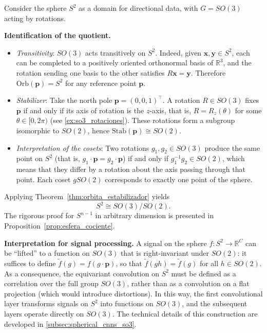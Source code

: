 \begin{example}\label{ex:aplicacion_teorema_gdl}
Consider the sphere $S^2$ as a domain for directional data, with $G = SO(3)$ acting by rotations.

\textbf{Identification of the quotient.}
\begin{itemize}
    \item \emph{Transitivity}: $SO(3)$ acts transitively on $S^2$. Indeed, given $\mathbf{x}, \mathbf{y} \in S^2$, each can be completed to a positively oriented orthonormal basis of $\mathbb{R}^3$, and the rotation sending one basis to the other satisfies $R\mathbf{x} = \mathbf{y}$. Therefore $\mathrm{Orb}(\mathbf{p}) = S^2$ for any reference point $\mathbf{p}$.

    \item \emph{Stabilizer}: Take the north pole $\mathbf{p} = (0,0,1)^{\!\top}$. A rotation $R \in SO(3)$ fixes $\mathbf{p}$ if and only if its axis of rotation is the $z$-axis, that is, $R = R_z(\theta)$ for some $\theta \in [0, 2\pi)$ (see \autoref{ex:so3_rotaciones}). These rotations form a subgroup isomorphic to $SO(2)$, hence $\mathrm{Stab}(\mathbf{p}) \cong SO(2)$.

    \item \emph{Interpretation of the cosets}: Two rotations $g_1, g_2 \in SO(3)$ produce the same point on $S^2$ (that is, $g_1 \cdot \mathbf{p} = g_2 \cdot \mathbf{p}$) if and only if $g_1^{-1}g_2 \in SO(2)$, which means that they differ by a rotation about the axis passing through that point. Each coset $gSO(2)$ corresponds to exactly one point of the sphere.
\end{itemize}
Applying Theorem~\ref{thm:orbita_estabilizador} yields
\begin{equation}\label{eq:esfera_cociente_ejemplo}
    S^2 \cong SO(3)/SO(2).
\end{equation}
The rigorous proof for $S^{n-1}$ in arbitrary dimension is presented in Proposition~\ref{prop:esfera_cociente}.

\textbf{Interpretation for signal processing.}
A signal on the sphere $f\colon S^2 \to \mathbb{R}^C$ can be ``lifted'' to a function on $SO(3)$ that is right-invariant under $SO(2)$: it suffices to define $\tilde{f}(g) = f(g \cdot \mathbf{p})$, so that $\tilde{f}(gh) = \tilde{f}(g)$ for all $h \in SO(2)$. As a consequence, the equivariant convolution on $S^2$ must be defined as a correlation over the full group $SO(3)$, rather than as a convolution on a flat projection (which would introduce distortions). In this way, the first convolutional layer transforms signals on $S^2$ into functions on $SO(3)$, and the subsequent layers operate directly on $SO(3)$. The technical details of this construction are developed in \autoref{subsec:spherical_cnns_so3}.


\end{example}
